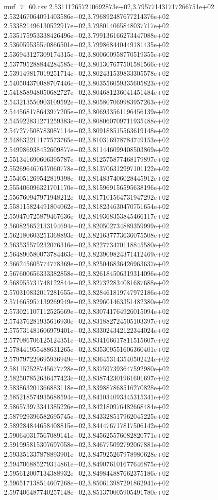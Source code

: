 \begin{filecontents*}{muf_7_60.csv}
2.531112657210692873e+02,3.795771431717266751e+02
2.532467064091403586e+02,3.796892487677214376e+02
2.533821496130522917e+02,3.798014065848037717e+02
2.535175953338426496e+02,3.799136166273447088e+02
2.536059535570866501e+02,3.799868440449181435e+02
2.536943127309174315e+02,3.800600958770519355e+02
2.537795288844284585e+02,3.801307677501581566e+02
2.539149817019251714e+02,3.802431539833305578e+02
2.540504370088707446e+02,3.803556059335605823e+02
2.541858948050682727e+02,3.804681236041451484e+02
2.543213550903109592e+02,3.805807069983957263e+02
2.544568178643977205e+02,3.806933561196456139e+02
2.545922831271259383e+02,3.808060709711935488e+02
2.547277508783087114e+02,3.809188515563619148e+02
2.548632211177573765e+02,3.810316978784749153e+02
2.549986938452609877e+02,3.811446099408503869e+02
2.551341690606395787e+02,3.812575877468179897e+02
2.552696467637060778e+02,3.813706312997101122e+02
2.554051269542819398e+02,3.814837406028445912e+02
2.555406096321701170e+02,3.815969156595638196e+02
2.556760947971948212e+02,3.817101564731947292e+02
2.558115824491804062e+02,3.818234630470751654e+02
2.559470725879467636e+02,3.819368353845466117e+02
2.560825652133194694e+02,3.820502734889359999e+02
2.562180603251368893e+02,3.821637773636075508e+02
2.563535579232076316e+02,3.822773470118845580e+02
2.564890580073784463e+02,3.823909824371412469e+02
2.566245605774778369e+02,3.825046836426963637e+02
2.567600656333382858e+02,3.826184506319314096e+02
2.568955731748122844e+02,3.827322834081687688e+02
2.570310832017281655e+02,3.828461819747972186e+02
2.571665957139269949e+02,3.829601463351482380e+02
2.573021107112525669e+02,3.830741764926015094e+02
2.574376281935616930e+02,3.831882724505103397e+02
2.575731481606979401e+02,3.833024342122344024e+02
2.577086706125124351e+02,3.834166617811515607e+02
2.578441955488631265e+02,3.835309551606360401e+02
2.579797229695936949e+02,3.836453143540502424e+02
2.581152528745677728e+02,3.837597393647592980e+02
2.582507852636477423e+02,3.838742301961601697e+02
2.583863201366883118e+02,3.839887868516270828e+02
2.585218574935688594e+02,3.841034093345315341e+02
2.586573973341385226e+02,3.842180976482668484e+02
2.587929396582695745e+02,3.843328517962045225e+02
2.589284844658408815e+02,3.844476717817506142e+02
2.590640317567089141e+02,3.845625576082820771e+02
2.591995815307697058e+02,3.846775092792067881e+02
2.593351337878893901e+02,3.847925267978980628e+02
2.594706885279314861e+02,3.849076101677646875e+02
2.595612007134388932e+02,3.849844887662375186e+02
2.596517138514607268e+02,3.850613987291862941e+02
2.597406487740257148e+02,3.851370005905491780e+02

\end{filecontents*}
